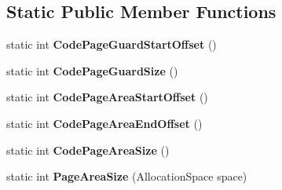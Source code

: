 \subsection*{Static Public Member Functions}
\begin{DoxyCompactItemize}
\item 
static int {\bfseries Code\+Page\+Guard\+Start\+Offset} ()\hypertarget{classv8_1_1internal_1_1_memory_allocator_ad43cb45b7e648d7d94dd74569e7cdb14}{}\label{classv8_1_1internal_1_1_memory_allocator_ad43cb45b7e648d7d94dd74569e7cdb14}

\item 
static int {\bfseries Code\+Page\+Guard\+Size} ()\hypertarget{classv8_1_1internal_1_1_memory_allocator_a0590c1c4b4d8ee366b602d15e36836d8}{}\label{classv8_1_1internal_1_1_memory_allocator_a0590c1c4b4d8ee366b602d15e36836d8}

\item 
static int {\bfseries Code\+Page\+Area\+Start\+Offset} ()\hypertarget{classv8_1_1internal_1_1_memory_allocator_a6a6e23c9c65d7ca6d0d67b0928ca754b}{}\label{classv8_1_1internal_1_1_memory_allocator_a6a6e23c9c65d7ca6d0d67b0928ca754b}

\item 
static int {\bfseries Code\+Page\+Area\+End\+Offset} ()\hypertarget{classv8_1_1internal_1_1_memory_allocator_a18785f4628e23735eff19578aecb7906}{}\label{classv8_1_1internal_1_1_memory_allocator_a18785f4628e23735eff19578aecb7906}

\item 
static int {\bfseries Code\+Page\+Area\+Size} ()\hypertarget{classv8_1_1internal_1_1_memory_allocator_a486888d82bb8401f97f88a192986bb4b}{}\label{classv8_1_1internal_1_1_memory_allocator_a486888d82bb8401f97f88a192986bb4b}

\item 
static int {\bfseries Page\+Area\+Size} (Allocation\+Space space)\hypertarget{classv8_1_1internal_1_1_memory_allocator_a2ae4299e11848cb944938601d7da24a2}{}\label{classv8_1_1internal_1_1_memory_allocator_a2ae4299e11848cb944938601d7da24a2}

\end{DoxyCompactItemize}
